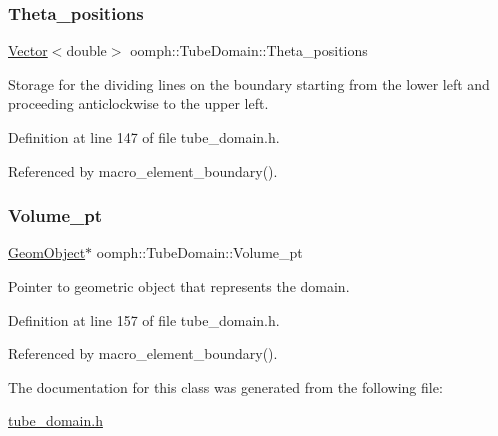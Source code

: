 \subsubsection{\texorpdfstring{Theta\+\_\+positions}{Theta\_positions}}
{\footnotesize\ttfamily \hyperlink{classoomph_1_1Vector}{Vector}$<$double$>$ oomph\+::\+Tube\+Domain\+::\+Theta\+\_\+positions\hspace{0.3cm}{\ttfamily [private]}}



Storage for the dividing lines on the boundary starting from the lower left and proceeding anticlockwise to the upper left. 



Definition at line 147 of file tube\+\_\+domain.\+h.



Referenced by macro\+\_\+element\+\_\+boundary().

\mbox{\label{classoomph_1_1TubeDomain_a6dd70d59e8cd65e44444f78fbfa1f97a}} 
\subsubsection{\texorpdfstring{Volume\+\_\+pt}{Volume\_pt}}
{\footnotesize\ttfamily \hyperlink{classoomph_1_1GeomObject}{Geom\+Object}$\ast$ oomph\+::\+Tube\+Domain\+::\+Volume\+\_\+pt\hspace{0.3cm}{\ttfamily [private]}}



Pointer to geometric object that represents the domain. 



Definition at line 157 of file tube\+\_\+domain.\+h.



Referenced by macro\+\_\+element\+\_\+boundary().



The documentation for this class was generated from the following file\+:\begin{DoxyCompactItemize}
\item 
\hyperlink{tube__domain_8h}{tube\+\_\+domain.\+h}\end{DoxyCompactItemize}
